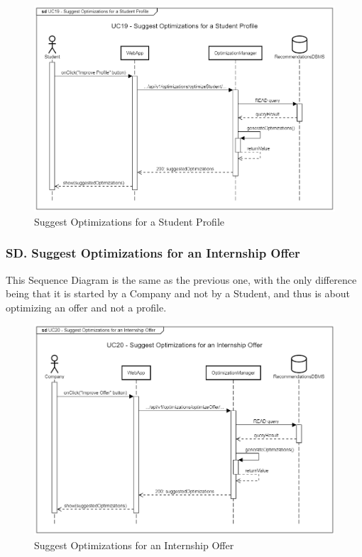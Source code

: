 \begin{figure}[H]
    \begin{center}
         \includegraphics[width=1\linewidth]{LaTeXCode/images/SequenceDiagrams/UC19-sequenceDiagram.png}
         \caption{Suggest Optimizations for a Student Profile}
         \label{fig:suggest_optimizations_student_sd}
     \end{center}
\end{figure}

\newpage

\subsubsection*{SD\cuc. Suggest Optimizations for an Internship Offer}
\label{subsubsec:suggest_optimizations_internship_sd}
This Sequence Diagram is the same as the previous one, with the only difference being that it is started by a Company and not by a Student, and thus is about optimizing an offer and not a profile.

\begin{figure}[H]
    \begin{center}
         \includegraphics[width=1\linewidth]{LaTeXCode/images/SequenceDiagrams/UC20-sequenceDiagram.png}
         \caption{Suggest Optimizations for an Internship Offer}
         \label{fig:suggest_optimizations_internship_sd}
     \end{center}
\end{figure}

